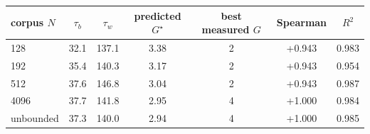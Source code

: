 \begin{tabular}{lcccccc}
\toprule
corpus $N$ & $\tau_b$ & $\tau_w$ & predicted $G^{\star}$ & best measured $G$ & Spearman & $R^2$ \\
\midrule
128 & 32.1 & 137.1 & 3.38 & 2 & +0.943 & 0.983 \\
192 & 35.4 & 140.3 & 3.17 & 2 & +0.943 & 0.954 \\
512 & 37.6 & 146.8 & 3.04 & 2 & +0.943 & 0.987 \\
4096 & 37.7 & 141.8 & 2.95 & 4 & +1.000 & 0.984 \\
unbounded & 37.3 & 140.0 & 2.94 & 4 & +1.000 & 0.985 \\
\bottomrule
\end{tabular}